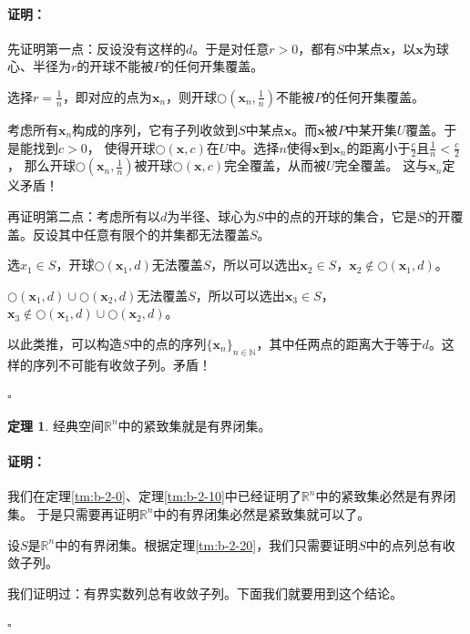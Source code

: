\documentclass[12pt,UTF8]{ctexbook}
\theoremstyle{definition}
\newtheorem{tm}{定理}[section]
\theoremstyle{plain}
\renewenvironment{proof}{\paragraph{\textbf{证明：}}}{\hfill$\square$}
\begin{document}
\begin{appendix}
\begin{proof}
    先证明第一点：反设没有这样的$d$。于是对任意$r>0$，都有$S$中某点$\mathbf{x}$，以$\mathbf{x}$为球心、半径为$r$的开球不能被$P$的任何开集覆盖。

    选择$r = \frac{1}{n}$，即对应的点为$\mathbf{x}_n$，则开球$\bigcirc\left(\mathbf{x}_n,\frac{1}{n}\right)$不能被$P$的任何开集覆盖。

    考虑所有$\mathbf{x}_n$构成的序列，它有子列收敛到$S$中某点$\mathbf{x}$。而$\mathbf{x}$被$P$中某开集$U$覆盖。于是能找到$c>0$，
    使得开球$\bigcirc(\mathbf{x},c)$在$U$中。选择$n$使得$\mathbf{x}$到$\mathbf{x}_n$的距离小于$\frac{c}{2}$且$\frac{1}{n} < \frac{c}{2}$，
    那么开球$\bigcirc\left(\mathbf{x}_n,\frac{1}{n}\right)$被开球$\bigcirc(\mathbf{x},c)$完全覆盖，从而被$U$完全覆盖。
    这与$\mathbf{x}_n$定义矛盾！

    再证明第二点：考虑所有以$d$为半径、球心为$S$中的点的开球的集合，它是$S$的开覆盖。反设其中任意有限个的并集都无法覆盖$S$。

    选$x_1\in S$，开球$\bigcirc(\mathbf{x}_1,d)$无法覆盖$S$，所以可以选出$\mathbf{x}_2\in S$，$\mathbf{x}_2\notin \bigcirc(\mathbf{x}_1,d)$。

    $\bigcirc(\mathbf{x}_1,d)\cup \bigcirc(\mathbf{x}_2,d)$无法覆盖$S$，所以可以选出$\mathbf{x}_3\in S$，$\mathbf{x}_3\notin \bigcirc(\mathbf{x}_1,d)\cup \bigcirc(\mathbf{x}_2,d)$。

    以此类推，可以构造$S$中的点的序列$\{\mathbf{x}_n\}_{n\in\mathbb{N}}$，其中任两点的距离大于等于$d$。这样的序列不可能有收敛子列。矛盾！

\end{proof}

\begin{tm}
    经典空间$\mathbb{R}^n$中的紧致集就是有界闭集。
\end{tm}

\begin{proof}
    我们在定理\ref{tm:b-2-0}、定理\ref{tm:b-2-10}中已经证明了$\mathbb{R}^n$中的紧致集必然是有界闭集。
    于是只需要再证明$\mathbb{R}^n$中的有界闭集必然是紧致集就可以了。

    设$S$是$\mathbb{R}^n$中的有界闭集。根据定理\ref{tm:b-2-20}，我们只需要证明$S$中的点列总有收敛子列。

    我们证明过：有界实数列总有收敛子列。下面我们就要用到这个结论。


\end{proof}
\end{appendix}
\end{document}
